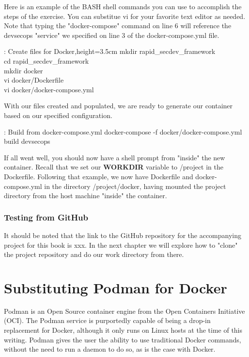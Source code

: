 \justify
Here is an example of the BASH shell commands you can use to accomplish
the steps of the exercise. You can substitue vi for your favorite text
editor as needed. Note that typing the "docker-compose" command on line
6 will reference the devsecops "service" we specified on line 3 of the
docker-compose.yml file.

\justify
\begin{mybox}{\thetcbcounter: Create files for Docker,height=3.5cm}
  mkdir rapid\_secdev\_framework\\
  cd rapid\_secdev\_framework\\
  mkdir docker\\
  vi docker/Dockerfile\\
  vi docker/docker-compose.yml
\end{mybox}

\justify
With our files created and populated, we are ready to generate our
container based on our specified configuration.

\begin{mybox}{\thetcbcounter: Build from docker-compose.yml }
  docker-compose -f docker/docker-compose.yml build devsecops
\end{mybox}

\justify
If all went well, you should now have a shell prompt from "inside" the
new container. Recall that we set our \textbf{WORKDIR} variable to /project in the Dockerfile. Following that example, we now have Dockerfile and docker-compose.yml in the directory /project/docker, having mounted the project directory from the host machine "inside" the container.

\subsubsection{Testing from GitHub}
\justify
It should be noted that the link to the GitHub repository
for the accompanying project for this book is xxx. In the next chapter
we will explore how to "clone" the project repository and do our work directory from there.

\section{Substituting Podman for Docker}
\justify
Podman is an Open Source container engine from the Open Containers Initiative (OCI). The Podman service is purportedly capable of being a drop-in replacement for Docker, although it only runs on Linux hosts at the time of this writing. Podman gives the user the ability to use traditional Docker commands, without the need to run a daemon to do so,
as is the case with Docker.

